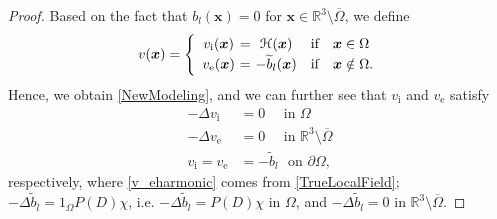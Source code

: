 \documentclass[reqno]{siamonline1116}
\numberwithin{theorem}{section}
\numberwithin{equation}{section}
\def\R{{\mathbb R}}
\def\Om{\Omega}
\def\p{\partial}
\def\x{\boldsymbol{x}}
\def\mH{{\mathcal H}}
\def\wt{\widetilde}
\begin{document}
\begin{proof}
Based on the fact that $b_l(\x)=0$ for $\x\in\R^3\setminus\overline{\Om}$, we define
\begin{align*}
v(\x)=\left\{\begin{array}{cccll}
v_{\mathrm i}(\x)\hspace{-0.65em}&=\hspace{-0.65em}&\mH(\x)&\text{if}&\x\in\Om \vspace{0.125em}\\
v_{\mathrm e}(\x)\hspace{-0.65em}&=\hspace{-0.65em}&-\wt{b}_l(\x)&\text{if}&\x\notin\Om.
\end{array}\right.
\end{align*}
Hence, we obtain \cref{NewModeling}, and we can further see that $v_{\mathrm i}$ and $v_{\mathrm e}$ satisfy
\begin{align}
-\Delta v_{\mathrm i}&=0~~~~~~\text{in }  \Om \label{v_iharmonic}\\
-\Delta v_{\mathrm e}&=0~~~~~~\text{in }  \R^3\setminus\overline{\Om} \label{v_eharmonic}\\
v_{\mathrm i}=v_{\mathrm e}&=-\wt{b}_l~~~\text{on } \p\Om, \label{vboundaryconti}
\end{align}
respectively, where \cref{v_eharmonic} comes from \cref{TrueLocalField}; $-\Delta\wt{b}_l=1_{\Om}P(D)\chi$, i.e. $-\Delta\wt{b}_l=P(D)\chi$ in $\Om$, and $-\Delta\wt{b}_l=0$ in $\R^3\setminus\overline{\Om}$.


\end{proof}
\end{document}
